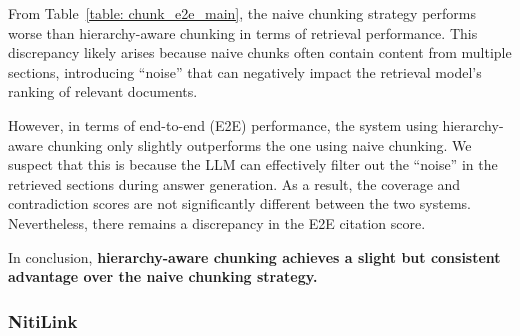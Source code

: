 

From Table~\ref{table: chunk_e2e_main}, the naive chunking strategy performs worse than hierarchy-aware chunking in terms of retrieval performance. 
%
This discrepancy likely arises because naive chunks often contain content from multiple sections, introducing \enquote{noise} that can negatively impact the retrieval model's ranking of relevant documents.  

However, in terms of end-to-end (E2E) performance, the system using hierarchy-aware chunking only slightly outperforms the one using naive chunking. 
%
We suspect that this is because the LLM can effectively filter out the \enquote{noise} in the retrieved sections during answer generation. 
%
As a result, the coverage and contradiction scores are not significantly different between the two systems.
%
Nevertheless, there remains a discrepancy in the E2E citation score.  

In conclusion, \textbf{hierarchy-aware chunking achieves a slight but consistent advantage over the naive chunking strategy.}

\subsubsection{NitiLink}
\label{subsubsec: referencer_result}

